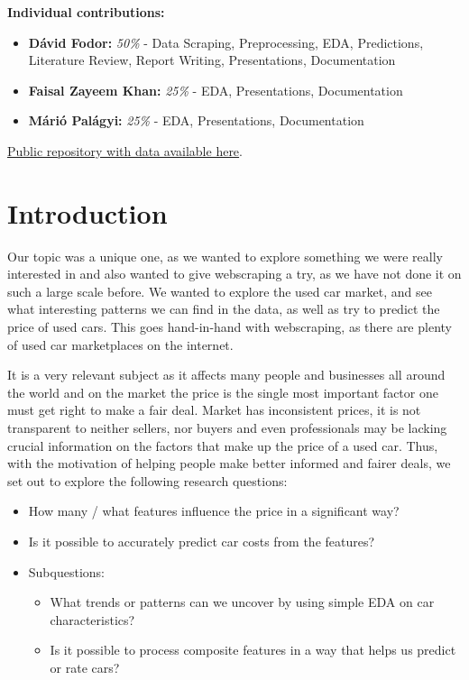 \documentclass[12pt]{article}
\begin{document}
\vfill

\textbf{Individual contributions:}
\begin{itemize}
  \item \textbf{Dávid Fodor:} \textit{50\%} - Data Scraping, Preprocessing, EDA, Predictions, Literature Review, Report Writing, Presentations, Documentation
  \item \textbf{Faisal Zayeem Khan:} \textit{25\%} - EDA, Presentations, Documentation
  \item \textbf{Márió Palágyi:} \textit{25\%} - EDA, Presentations, Documentation
\end{itemize}

\vspace{1em}
\href{https://github.com/dfoddav2/SS25-capstone-project}{Public repository with data available here}.

\newpage
\tableofcontents

\newpage
\section{Introduction}

Our topic was a unique one, as we wanted to explore something we were really interested in and also wanted to give webscraping a try, as we have not done it on such a large scale before.
We wanted to explore the used car market, and see what interesting patterns we can find in the data, as well as try to predict the price of used cars.
This goes hand-in-hand with webscraping, as there are plenty of used car marketplaces on the internet.

It is a very relevant subject as it affects many people and businesses all around the world and on the market the price is the single most important factor one must get right to make a fair deal.
Market has inconsistent prices, it is not transparent to neither sellers, nor buyers and even professionals may be lacking crucial information on the factors that make up the price of a used car.
Thus, with the motivation of helping people make better informed and fairer deals, we set out to explore the following research questions:

\begin{itemize}
  \item How many / what features influence the price in a significant way?
  \item Is it possible to accurately predict car costs from the features?
  \item Subquestions:
    \begin{itemize}
      \item What trends or patterns can we uncover by using simple EDA on car characteristics?
      \item Is it possible to process composite features in a way that helps us predict or rate cars?
    \end{itemize}
\end{itemize}
\end{document}
